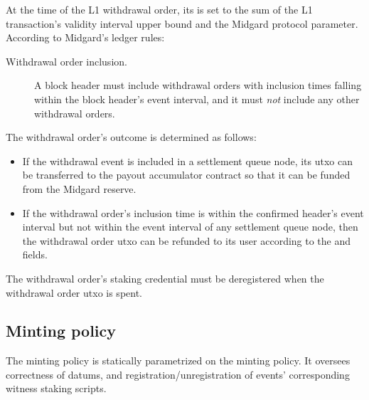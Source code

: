 \documentclass[../midgard.tex]{subfiles}
\begin{document}

At the time of the L1 withdrawal order, its  is set to the sum of the L1 transaction's validity interval upper bound and the  Midgard protocol parameter.
According to Midgard's ledger rules:
\begin{description}
    \item[Withdrawal order inclusion.] A block header must include withdrawal orders with inclusion times falling within the block header's event interval, and it must \emph{not} include any other withdrawal orders.
\end{description}

The withdrawal order's outcome is determined as follows:
\begin{itemize}
    \item If the withdrawal event is included in a settlement queue node, its utxo can be transferred to the payout accumulator contract so that it can be funded from the Midgard reserve.
    \item If the withdrawal order's inclusion time is within the confirmed header's event interval but not within the event interval of any settlement queue node, then the withdrawal order utxo can be refunded to its user according to the  and  fields.
\end{itemize}

The withdrawal order's  staking credential must be deregistered when the withdrawal order utxo is spent.

\subsection{Minting policy}
\label{h:withdrawal-order-minting-policy}

The  minting policy is statically parametrized on the  minting policy.
It oversees correctness of datums, and registration/unregistration of events' corresponding witness staking scripts.
\end{document}
